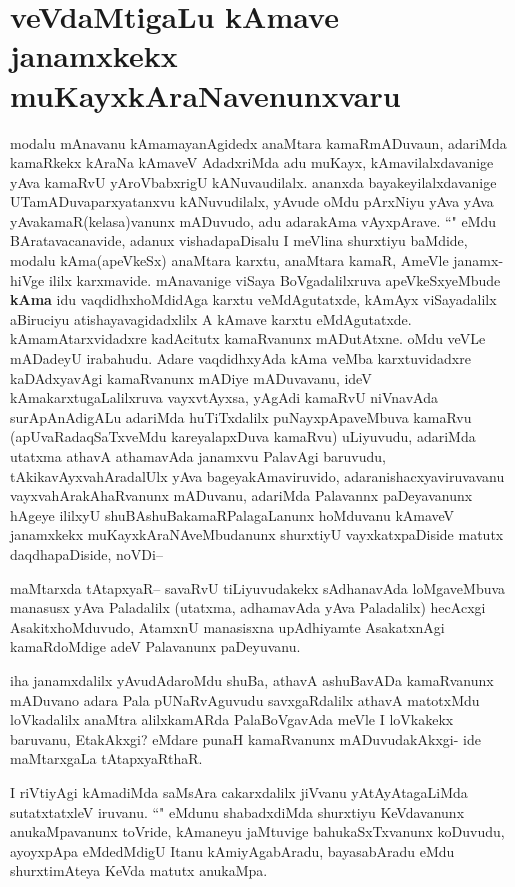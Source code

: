 \section*{veVdaMtigaLu kAmave janamxkekx muKayxkAraNavenunxvaru}
\begin{artha}
modalu mAnavanu kAmamayanAgidedx anaMtara kamaRmADuvaun, adariMda kamaRkekx kAraNa kAmaveV AdadxriMda adu muKayx, kAmavilalxdavanige yAva kamaRvU yAroVbabxrigU kANuvaudilalx. ananxda bayakeyilalxdavanige UTamADuvaparxyatanxvu kANuvudilalx, yAvude oMdu pArxNiyu  yAva yAva yAvakamaR(kelasa)vanunx mADuvudo, adu adarakAma vAyxpArave. ``\stext" eMdu BAratavacanavide, adanux vishadapaDisalu I meVlina shurxtiyu baMdide, modalu kAma(apeVkeSx) anaMtara karxtu, anaMtara kamaR, AmeVle janamx-hiVge ililx karxmavide.
mAnavanige viSaya BoVgadalilxruva apeVkeSxyeMbude \textbf{kAma} idu vaqdidhxhoMdidAga karxtu veMdAgutatxde, kAmAyx viSayadalilx aBiruciyu atishayavagidadxlilx A kAmave karxtu eMdAgutatxde. kAmamAtarxvidadxre kadAcitutx kamaRvanunx mADutAtxne. oMdu veVLe  mADadeyU irabahudu. Adare vaqdidhxyAda kAma veMba karxtuvidadxre kaDAdxyavAgi kamaRvanunx mADiye mADuvavanu, ideV kAmakarxtugaLalilxruva vayxvtAyxsa, yAgAdi kamaRvU niVnavAda surApAnAdigALu adariMda huTiTxdalilx puNayxpApaveMbuva kamaRvu (apUvaRadaqSaTxveMdu kareyalapxDuva kamaRvu) uLiyuvudu, adariMda utatxma athavA athamavAda janamxvu PalavAgi baruvudu, tAkikavAyxvahAradalUlx yAva bageyakAmaviruvido, adaranishacxyaviruvavanu vayxvahArakAhaRvanunx mADuvanu, adariMda Palavannx paDeyavanunx hAgeye ililxyU shuBAshuBakamaRPalagaLanunx hoMduvanu kAmaveV janamxkekx muKayxkAraNAveMbudanunx shurxtiyU vayxkatxpaDiside matutx daqdhapaDiside, noVDi--
\end{artha}

\begin{artha}
maMtarxda tAtapxyaR-- savaRvU tiLiyuvudakekx sAdhanavAda loMgaveMbuva manasusx yAva Paladalilx (utatxma, adhamavAda yAva Paladalilx) hecAcxgi AsakitxhoMduvudo, AtamxnU manasisxna upAdhiyamte AsakatxnAgi kamaRdoMdige adeV Palavanunx paDeyuvanu.

iha janamxdalilx yAvudAdaroMdu shuBa, athavA ashuBavADa kamaRvanunx mADuvano adara Pala pUNaRvAguvudu savxgaRdalilx athavA matotxMdu loVkadalilx anaMtra alilxkamARda PalaBoVgavAda meVle I loVkakekx baruvanu, EtakAkxgi? eMdare punaH kamaRvanunx mADuvudakAkxgi- ide maMtarxgaLa tAtapxyaRthaR.
\end{artha}

\begin{artha}
I riVtiyAgi kAmadiMda saMsAra cakarxdalilx jiVvanu yAtAyAtagaLiMda sutatxtatxleV iruvanu. ``\stext" eMdunu shabadxdiMda shurxtiyu KeVdavanunx anukaMpavanunx toVride, kAmaneyu jaMtuvige bahukaSxTxvanunx koDuvudu, ayoyxpApa eMdedMdigU Itanu kAmiyAgabAradu, bayasabAradu eMdu shurxtimAteya KeVda matutx anukaMpa.
\end{artha}


